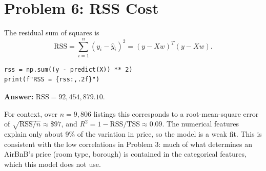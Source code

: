 \documentclass[11pt]{article}
\begin{document}
\section*{Problem 6: RSS Cost}

The residual sum of squares is
\[
  \text{RSS} = \sum_{i=1}^{n} (y_i - \hat{y}_i)^2 = (y - Xw)^T (y - Xw).
\]

\begin{lstlisting}
rss = np.sum((y - predict(X)) ** 2)
print(f"RSS = {rss:,.2f}")
\end{lstlisting}

\textbf{Answer:} $\text{RSS} = 92{,}454{,}879.10$.

For context, over $n = 9{,}806$ listings this corresponds to a root-mean-square error
of $\sqrt{\text{RSS}/n} \approx \$97$, and $R^2 = 1 - \text{RSS}/\text{TSS} \approx 0.09$.
The numerical features explain only about 9\% of the variation in price, so the model
is a weak fit. This is consistent with the low correlations in Problem 3: much of what
determines an AirBnB's price (room type, borough) is contained in the categorical
features, which this model does not use.
\end{document}
